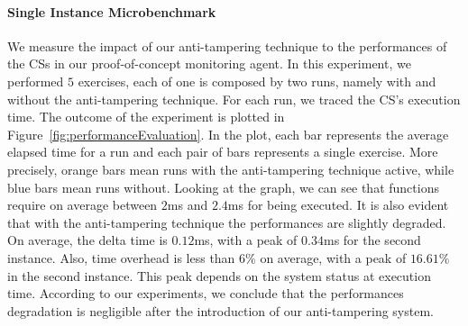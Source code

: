 \paragraph{\textbf{Single Instance Microbenchmark}}
We measure the impact of our anti-tampering technique to the performances of 
the CSs in our proof-of-concept monitoring agent.
In this experiment, we performed $5$ exercises, each of one is composed by two 
runs, namely with and without the anti-tampering technique.
For each run, we traced the CS's execution time.
The outcome of the experiment is plotted in 
Figure~\ref{fig:performanceEvaluation}. %
In the plot, each bar represents the average elapsed time for a run and each 
pair of bars represents a single exercise. More precisely, orange bars
mean runs with the anti-tampering technique active, while blue bars mean runs 
without.
Looking at the graph, we can see that functions require on average between 
$2$ms and $2.4$ms for being executed.
It is also evident that with the anti-tampering technique the performances are 
slightly degraded.
On average, the delta time is $0.12$ms, with a peak of $0.34$ms for the second 
instance. 
Also, time overhead is less than $6\%$ on average, with a peak of $16.61\%$ in 
the second instance. 
This peak depends on the system status at execution time.
According to our experiments, we conclude that the performances degradation is 
negligible after the introduction of our anti-tampering system.

